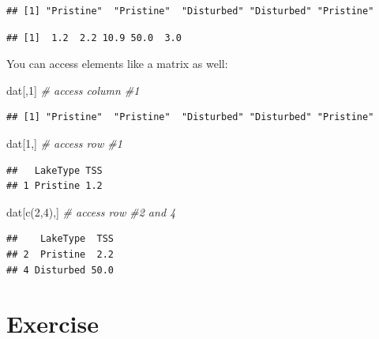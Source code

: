 \documentclass[
]{book}
\newenvironment{Shaded}{\begin{snugshade}}{\end{snugshade}}
\newcommand{\CommentTok}[1]{\textcolor[rgb]{0.56,0.35,0.01}{\textit{#1}}}
\newcommand{\DecValTok}[1]{\textcolor[rgb]{0.00,0.00,0.81}{#1}}
\newcommand{\FunctionTok}[1]{\textcolor[rgb]{0.00,0.00,0.00}{#1}}
\newcommand{\NormalTok}[1]{#1}
\newcommand{\SpecialCharTok}[1]{\textcolor[rgb]{0.00,0.00,0.00}{#1}}
\begin{document}
\begin{verbatim}
## [1] "Pristine"  "Pristine"  "Disturbed" "Disturbed" "Pristine"
\end{verbatim}

\begin{Shaded}
\end{Shaded}

\begin{verbatim}
## [1]  1.2  2.2 10.9 50.0  3.0
\end{verbatim}

You can access elements like a matrix as well:

\begin{Shaded}
\begin{Highlighting}[]
\NormalTok{dat[,}\DecValTok{1}\NormalTok{] }\CommentTok{\# access column \#1}
\end{Highlighting}
\end{Shaded}

\begin{verbatim}
## [1] "Pristine"  "Pristine"  "Disturbed" "Disturbed" "Pristine"
\end{verbatim}

\begin{Shaded}
\begin{Highlighting}[]
\NormalTok{dat[}\DecValTok{1}\NormalTok{,] }\CommentTok{\# access row \#1}
\end{Highlighting}
\end{Shaded}

\begin{verbatim}
##   LakeType TSS
## 1 Pristine 1.2
\end{verbatim}

\begin{Shaded}
\begin{Highlighting}[]
\NormalTok{dat[}\FunctionTok{c}\NormalTok{(}\DecValTok{2}\NormalTok{,}\DecValTok{4}\NormalTok{),] }\CommentTok{\# access row \#2 and 4}
\end{Highlighting}
\end{Shaded}

\begin{verbatim}
##    LakeType  TSS
## 2  Pristine  2.2
## 4 Disturbed 50.0
\end{verbatim}

\hypertarget{exercise}{%
\section{Exercise}\label{exercise}}
\end{document}
